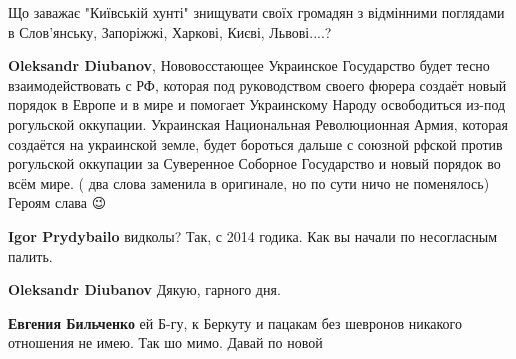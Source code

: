 \begin{itemize}
\begin{itemize}
Що заважає "Київській хунті" знищувати своїх громадян з відмінними поглядами в
Слов'янську, Запоріжжі, Харкові, Києві, Львові....?

 
\textbf{Oleksandr Diubanov}, Нововосстающее Украинское Государство будет тесно
взаимодействовать с РФ, которая под руководством своего фюрера создаёт новый
порядок в Европе и в мире и помогает Украинскому Народу освободиться из-под
рогульской оккупации.  Украинская Национальная Революционная Армия, которая
создаётся на украинской земле, будет бороться дальше с союзной рфской против
рогульской оккупации за Суверенное Соборное Государство и новый порядок во всём
мире. ( два слова заменила в оригинале, но по сути ничо не поменялось) Героям
слава 😉

 
\textbf{Igor Prydybailo} видколы? Так, с 2014 годика. Как вы начали по несогласным палить.

 
\textbf{Oleksandr Diubanov} Дякую, гарного дня.

 
\textbf{Евгения Бильченко} ей Б-гу, к Беркуту и пацакам без шевронов никакого отношения не имею. Так шо мимо. Давай по новой

 

\end{itemize}
\end{itemize}
